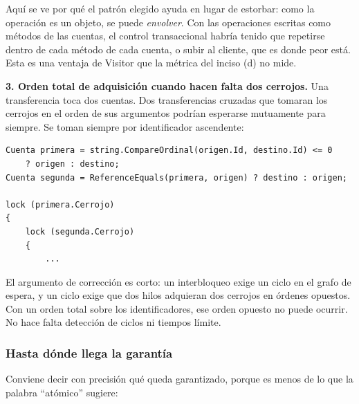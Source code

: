 Aquí se ve por qué el patrón elegido ayuda en lugar de estorbar: como la operación es un
objeto, se puede \emph{envolver}. Con las operaciones escritas como métodos de las cuentas, el
control transaccional habría tenido que repetirse dentro de cada método de cada cuenta, o
subir al cliente, que es donde peor está. Esta es una ventaja de Visitor que la métrica del
inciso (d) no mide.

\textbf{3. Orden total de adquisición cuando hacen falta dos cerrojos.} Una transferencia toca
dos cuentas. Dos transferencias cruzadas que tomaran los cerrojos en el orden de sus
argumentos podrían esperarse mutuamente para siempre. Se toman siempre por identificador
ascendente:

{\small
\begin{verbatim}
Cuenta primera = string.CompareOrdinal(origen.Id, destino.Id) <= 0
    ? origen : destino;
Cuenta segunda = ReferenceEquals(primera, origen) ? destino : origen;

lock (primera.Cerrojo)
{
    lock (segunda.Cerrojo)
    {
        ...
\end{verbatim}
}

El argumento de corrección es corto: un interbloqueo exige un ciclo en el grafo de espera, y
un ciclo exige que dos hilos adquieran dos cerrojos en órdenes opuestos. Con un orden total
sobre los identificadores, ese orden opuesto no puede ocurrir. No hace falta detección de
ciclos ni tiempos límite.

\subsubsection*{Hasta dónde llega la garantía}

Conviene decir con precisión qué queda garantizado, porque es menos de lo que la palabra
``atómico'' sugiere:

